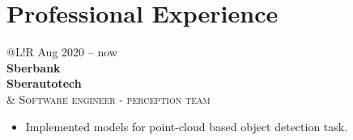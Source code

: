 \documentclass[10pt, a4paper]{extarticle}
\newcommand\boldgrey[1]{\textcolor{mygray}{\textbf{#1}}}
\newcommand\VRule{\color{lightgray}\vrule width 0.5pt}
\begin{document}
\section*{Professional Experience}
\begin{tabular}{@{}L!{\VRule}R}
    Aug 2020 -- now                                                                                                       \\ {\bf Sberbank} \\ \boldgrey{Sberautotech \\} &
    {\textsc{Software engineer - perception team}}

    \begin{itemize}
        \item Implemented models for point-cloud based object detection task.
    \end{itemize}
    

\end{tabular}
\end{document}
